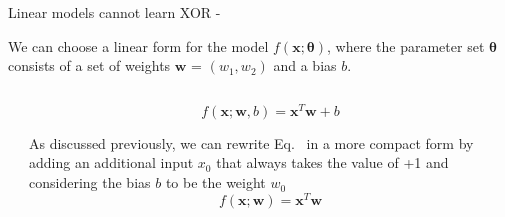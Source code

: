 %
%
%

\begin{frame}[t,allowframebreaks]{Linear models cannot learn XOR -} 

    We can choose a linear form for the model $f(\mathbf{x};\mathbf{\theta})$,
    where the parameter set $\mathbf{\theta}$ consists 
    of a set of weights $\mathbf{w}$ = $(w_1,w_2)$ and a bias $b$.        

    \begin{columns}[t]
        \begin{column}{0.50\textwidth}
            \vspace{-0.6cm}
            \begin{center}
            \end{center}        
        \end{column}
        \begin{column}{0.50\textwidth}
            \begin{equation}
                f(\mathbf{x};\mathbf{w},b) = \mathbf{x}^{T} \mathbf{w} + b
                \label{eq:learn_xor_model_1}
            \end{equation}

            As discussed previously, we can rewrite Eq.~\label{eq:learn_xor_model_1}
            in a more compact form by adding an additional input $x_0$ that always takes the value of +1 
            and considering the bias $b$ to be the weight $w_0$
            \begin{equation}
                f(\mathbf{x};\mathbf{w}) = \mathbf{x}^{T} \mathbf{w}
                \label{eq:learn_xor_model_2}
            \end{equation}
        \end{column}
    \end{columns}
      

\end{frame}
